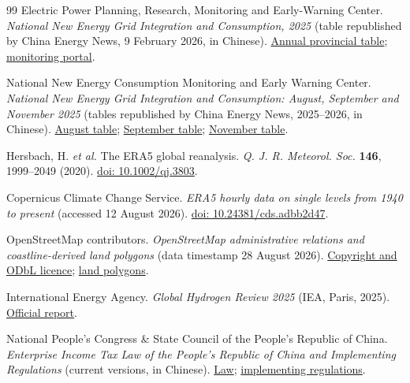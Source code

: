 \documentclass[pdflatex,sn-nature]{sn-jnl}
\begin{document}
\begin{thebibliography}{99}
Electric Power Planning, Research, Monitoring and Early-Warning Center. \emph{National New Energy Grid Integration and Consumption, 2025} (table republished by China Energy News, 9 February 2026, in Chinese). \href{https://epaper.ceic.com/pad/content/202602/09/content_20205.html}{Annual provincial table}; \href{https://www.xnyxnyj.cn/}{monitoring portal}.

National New Energy Consumption Monitoring and Early Warning Center. \emph{National New Energy Grid Integration and Consumption: August, September and November 2025} (tables republished by China Energy News, 2025--2026, in Chinese). \href{https://epaper.ceic.com/pc/attachment/202510/13/26e6af76-e1b7-40fb-b126-bc59f391e51c.pdf}{August table}; \href{https://epaper.ceic.com/pc/attachment/202511/07/6063762d-43ea-41fc-a37d-5f5549f62a5d.pdf}{September table}; \href{https://epaper.ceic.com/pc/attachment/202601/12/bf2a9f58-b724-435d-8c46-447e3ebbdc3d.pdf}{November table}.

Hersbach, H. \emph{et al.} The ERA5 global reanalysis. \emph{Q. J. R. Meteorol. Soc.} \textbf{146}, 1999--2049 (2020). \href{https://doi.org/10.1002/qj.3803}{doi: 10.1002/qj.3803}.

Copernicus Climate Change Service. \emph{ERA5 hourly data on single levels from 1940 to present} (accessed 12 August 2026). \href{https://doi.org/10.24381/cds.adbb2d47}{doi: 10.24381/cds.adbb2d47}.

OpenStreetMap contributors. \emph{OpenStreetMap administrative relations and coastline-derived land polygons} (data timestamp 28 August 2026). \href{https://www.openstreetmap.org/copyright}{Copyright and ODbL licence}; \href{https://osmdata.openstreetmap.de/data/land-polygons.html}{land polygons}.

International Energy Agency. \emph{Global Hydrogen Review 2025} (IEA, Paris, 2025). \href{https://www.iea.org/reports/global-hydrogen-review-2025}{Official report}.

National People's Congress \& State Council of the People's Republic of China. \emph{Enterprise Income Tax Law of the People's Republic of China and Implementing Regulations} (current versions, in Chinese). \href{https://flk.npc.gov.cn/detail?id=ff8080816f135f46016f2106acd11784}{Law}; \href{https://policy.mofcom.gov.cn/claw/clawContent.shtml?id=102338}{implementing regulations}.

\end{thebibliography}
\end{document}
